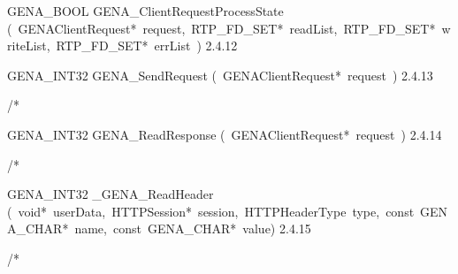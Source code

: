 \documentclass{article}
\begin{document}
\begin{cxxentry}
\begin{cxxentry}
\begin{cxxfunction}
\begin{cxxdoc}
\end{cxxdoc}
\end{cxxfunction}
\begin{cxxfunction}
{GENA\_BOOL}
        {GENA\_ClientRequestProcessState}
        {(\ GENAClientRequest*\ request,\ RTP\_FD\_SET*\ readList,\ RTP\_FD\_SET*\ writeList,\ RTP\_FD\_SET*\ errList\ )}
        {}
        {2.4.12}
\end{cxxfunction}
\begin{cxxfunction}
{GENA\_INT32}
        {GENA\_SendRequest}
        {(\ GENAClientRequest*\ request\ )}
        {}
        {2.4.13}
\begin{cxxdoc}
/*

\end{cxxdoc}
\end{cxxfunction}
\begin{cxxfunction}
{GENA\_INT32}
        {GENA\_ReadResponse}
        {(\ GENAClientRequest*\ request\ )}
        {}
        {2.4.14}
\begin{cxxdoc}
/*

\end{cxxdoc}
\end{cxxfunction}
\begin{cxxfunction}
{GENA\_INT32}
        {\_GENA\_ReadHeader}
        {(\ void*\ userData,\ HTTPSession*\ session,\ HTTPHeaderType\ type,\ const\ GENA\_CHAR*\ name,\ const\ GENA\_CHAR*\ value)}
        {}
        {2.4.15}
\begin{cxxdoc}
/*

\end{cxxdoc}
\end{cxxfunction}
\end{cxxentry}
\end{cxxentry}
\end{document}
